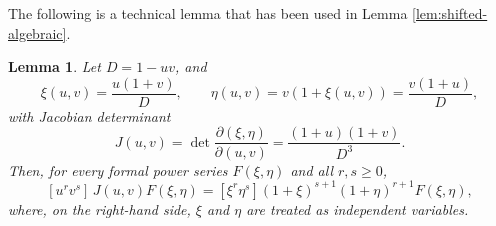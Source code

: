 \documentclass[12pt,a4paper,reqno]{amsart}
\numberwithin{equation}{section}
\newtheorem{lemma}[theorem]{Lemma}
\theoremstyle{definition}
\theoremstyle{remark}
\begin{document}
The following  is a technical lemma that has been used in Lemma \ref{lem:shifted-algebraic}. 



\begin{lemma}
\label{lem:coefficient-substitution}
Let $ D=1-uv$, and 
\begin{equation}\label{nj-9-mk9}
    \xi(u,v)=\frac{u(1+v)}{D},\qquad
 \eta(u,v)=v(1+\xi(u,v))=\frac{v(1+u)}{D},
\end{equation}
with Jacobian determinant
\begin{equation}\label{bn-sn-09}
 J(u,v)=\det\frac{\partial(\xi,\eta)}{\partial(u,v)}
       =\frac{(1+u)(1+v)}{D^3}.    
\end{equation}
Then, for every formal power series $F(\xi,\eta)$ and all $r,s\geq0$,
\begin{equation}\label{eq:coefficient-substitution}
 [u^rv^s]\,J(u,v)F(\xi,\eta)
 = [\xi^r\eta^s]
   (1+\xi)^{s+1}(1+\eta)^{r+1}F(\xi,\eta),
\end{equation}
where, on the right-hand side, $\xi$ and $\eta$ are treated as independent
  variables.
\end{lemma}
\end{document}
